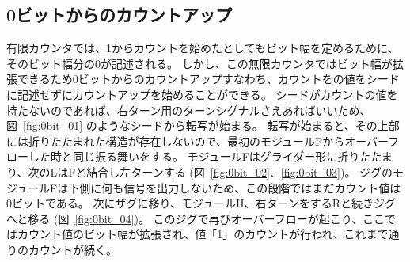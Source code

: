 \documentclass[a4,11pt]{article}
\begin{document}
\subsection{0ビットからのカウントアップ}
有限カウンタでは、1からカウントを始めたとしてもビット幅を定めるために、そのビット幅分の0が記述される。
しかし、この無限カウンタではビット幅が拡張できるため0ビットからのカウントアップすなわち、カウントをの値をシードに記述せずにカウントアップを始めることができる。
シードがカウントの値を持たないのであれば、右ターン用のターンシグナルさえあればいいため、図~\ref{fig:0bit_01}
のようなシードから転写が始まる。
転写が始まると、その上部には折りたたまれた構造が存在しないので、最初のモジュールFからオーバーフローした時と同じ振る舞いをする。
モジュールFはグライダー形に折りたたまり、次のLはFと結合し左ターンする (図~\ref{fig:0bit_02}、\ref{fig:0bit_03})。
ジグのモジュールFは下側に何も信号を出力しないため、この段階ではまだカウント値は0ビットである。
次にザグに移り、モジュールH、右ターンをするRと続きジグへと移る (図~\ref{fig:0bit_04})。
このジグで再びオーバーフローが起こり、ここではカウント値のビット幅が拡張され、値「1」のカウントが行われ、これまで通りのカウントが続く。
\end{document}
